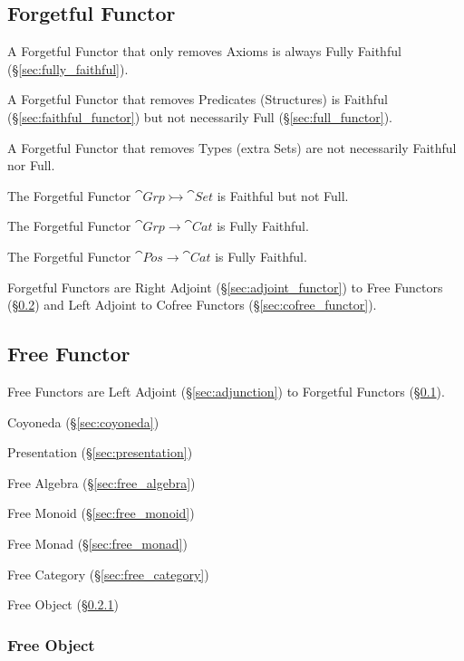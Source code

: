 \subsection{Forgetful Functor}\label{sec:forgetful_functor}

A Forgetful Functor that only removes Axioms is always Fully Faithful
(\S\ref{sec:fully_faithful}).

A Forgetful Functor that removes Predicates (Structures) is Faithful
(\S\ref{sec:faithful_functor}) but not necessarily Full
(\S\ref{sec:full_functor}).

A Forgetful Functor that removes Types (extra Sets) are not
necessarily Faithful nor Full.

The Forgetful Functor $\cat{Grp} \rightarrowtail \cat{Set}$ is
Faithful but not Full.

The Forgetful Functor $\cat{Grp} \rightarrow \cat{Cat}$ is
Fully Faithful.

The Forgetful Functor $\cat{Pos} \rightarrow \cat{Cat}$ is
Fully Faithful.

Forgetful Functors are Right Adjoint (\S\ref{sec:adjoint_functor}) to
Free Functors (\S\ref{sec:free_functor}) and Left Adjoint to Cofree
Functors (\S\ref{sec:cofree_functor}).



\subsection{Free Functor}\label{sec:free_functor}

Free Functors are Left Adjoint (\S\ref{sec:adjunction}) to Forgetful
Functors (\S\ref{sec:forgetful_functor}).

Coyoneda (\S\ref{sec:coyoneda})

Presentation (\S\ref{sec:presentation})

Free Algebra (\S\ref{sec:free_algebra})

Free Monoid (\S\ref{sec:free_monoid})

Free Monad (\S\ref{sec:free_monad})

Free Category (\S\ref{sec:free_category})

Free Object (\S\ref{sec:free_object})



\subsubsection{Free Object}\label{sec:free_object}


